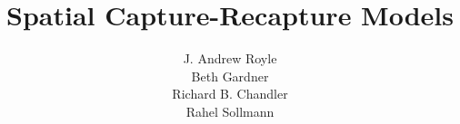 \documentclass[dvips]{book}
\theoremstyle{plain}
\theoremstyle{definition}
\theoremstyle{remark}
\begin{document}
\title{
Spatial Capture-Recapture Models
}
\subtitle{
}
\author{J. Andrew Royle \\
Beth Gardner \\ 
Richard B. Chandler \\ Rahel Sollmann}

\address{
USGS Patuxent Wildlife Research Center \\
North Carolina State University
}

\maketitle


\setcounter{tocdepth}{2}
\tableofcontents

\newpage

\hspace*{-.166in}{\LARGE Preface} \\

\vspace*{.2in}

%

\newpage

\hspace*{-.166in}{\LARGE Acknowledgements} \\

\vspace*{.2in}

%

\mainmatter






%
%



%
%
%

%
\end{document}

